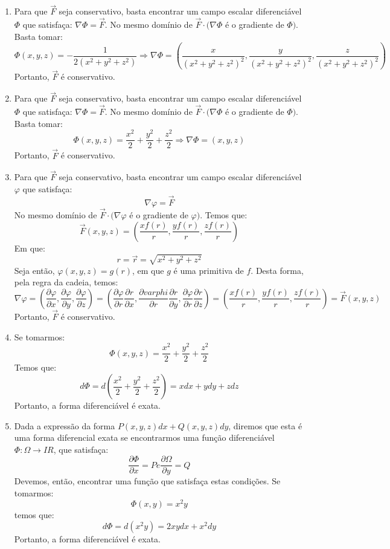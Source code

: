 \documentclass[11pt,a4paper]{article}
\begin{document}
\begin{enumerate}
\item Para que $ \vec{F} $ seja conservativo, basta encontrar um campo escalar diferenci\'{a}vel $ \Phi $ que satisfa\c{c}a: $ \nabla \Phi = \vec{F} $. No mesmo dom\'{i}nio de $ \vec{F} \cdot (	\nabla \Phi $ \'{e} o gradiente de $ \Phi ) $. Basta tomar: $$ \Phi (x,y,z) = - \frac{1}{2(x^2 + y^2 + z^2)} \Rightarrow \nabla \Phi = \left(\frac{x}{\left(x^2 + y^2 + z^2 \right)^2}, \frac{y}{\left(x^2 + y^2 + z^2 \right)^2}, \frac{z}{\left(x^2 + y^2 + z^2 \right)^2} \right) $$ Portanto, $ \vec{F} $ \'{e} conservativo.

\item Para que $ \vec{F} $ seja conservativo, basta encontrar um campo escalar diferenci\'{a}vel $ \Phi $ que satisfa\c{c}a: $ \nabla \Phi = \vec{F} $. No mesmo dom\'{i}nio de $ \vec{F} \cdot (\nabla \Phi $ \'{e} o gradiente de $ \Phi ) $. Basta tomar: $$ \Phi (x,y,z) = \frac{x^2}{2} + \frac{y^2}{2} + \frac{z^2}{2} \Rightarrow \nabla \Phi = (x,y,z) $$ Portanto, $ \vec{F} $ \'{e} conservativo.

\item Para que $ \vec{F} $ seja conservativo, basta encontrar um campo escalar diferenci\'{a}vel $ \varphi $ que satisfa\c{c}a: $$ \nabla \varphi = \vec{F} $$ No mesmo dom\'{i}nio de $ \vec{F} \cdot ( \nabla \varphi $ \'{e} o gradiente de $ \varphi ) $. Temos que: $$ \vec{F} (x,y,z) = \left(\frac{xf(r)}{r}, \frac{yf(r)}{r}, \frac{zf(r)}{r} \right) $$ Em que: $$ r = \vec{r} = \sqrt{x^2 + y^2 + z^2} $$ Seja ent\~{a}o, $ \varphi (x,y,z) = g(r) $, em que $ g $ \'{e} uma primitiva de $ f $. Desta forma, pela regra da cadeia, temos: $$ \nabla \varphi = \left(\frac{\partial \varphi}{\partial x}, \frac{\partial \varphi}{\partial y}, \frac{\partial \varphi}{\partial z} \right) = \left(\frac{\partial \varphi}{\partial r} \frac{\partial r}{\partial x}, \frac{\partial varphi}{\partial r} \frac{\partial r}{\partial y}, \frac{\partial \varphi}{\partial r} \frac{\partial r}{\partial z} \right) = \left(\frac{xf(r)}{r}, \frac{yf(r)}{r}, \frac{zf(r)}{r} \right) = \vec{F} (x,y,z) $$ Portanto, $ \vec{F} $ \'{e} conservativo.

\item Se tomarmos: $$ \Phi (x,y,z) = \frac{x^2}{2} + \frac{y^2}{2} + \frac{z^2}{2} $$ Temos que: $$ d \Phi = d \left(\frac{x^2}{2} + \frac{y^2}{2} + \frac{z^2}{2} \right) = xdx + ydy + zdz $$ Portanto, a forma diferenci\'{a}vel \'{e} exata.

\item Dada a express\~{a}o da forma $ P(x,y,z)dx + Q(x,y,z)dy $, diremos que esta \'{e} uma forma diferencial exata se encontrarmos uma fun\c{c}\~{a}o diferenci\'{a}vel $ \Phi : \Omega \longrightarrow I\!R $, que satisfa\c{c}a: $$ \frac{\partial \Phi}{\partial x} = P  e  \frac{\partial \Omega}{\partial y} = Q $$ Devemos, ent\~{a}o, encontrar uma fun\c{c}\~{a}o que satisfa\c{c}a estas condi\c{c}\~{o}es. Se tomarmos: $$ \Phi (x,y) = x^2 y $$ temos que: $$ d \Phi = d (x^2 y) = 2xydx + x^2dy $$ Portanto, a forma diferenci\'{a}vel \'{e} exata.


\end{enumerate}
\end{document}
